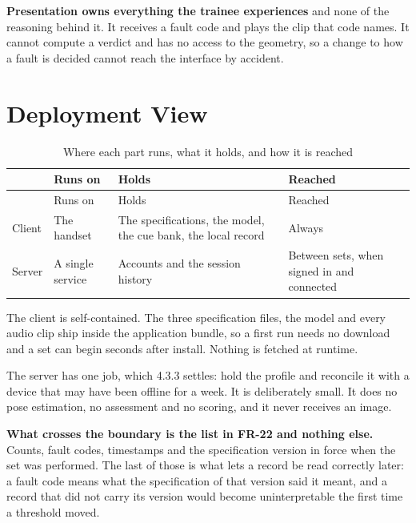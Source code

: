\textbf{Presentation owns everything the trainee experiences} and none of the reasoning behind it. It receives a fault code and plays the clip that code names. It cannot compute a verdict and has no access to the geometry, so a change to how a fault is decided cannot reach the interface by accident.

\section{Deployment View}
\label{sec:5.3}

{\footnotesize
\setlength{\LTpre}{6pt}\setlength{\LTpost}{8pt}
\begin{longtable}{>{\raggedright\arraybackslash}p{}>{\raggedright\arraybackslash}p{}>{\raggedright\arraybackslash}p{}>{\raggedright\arraybackslash}p{}}
\caption{Where each part runs, what it holds, and how it is reached}\\
\toprule
 & Runs on & Holds & Reached \\
\midrule
\endfirsthead
\toprule
 & Runs on & Holds & Reached \\
\midrule
\endhead
\bottomrule
\endfoot
\bottomrule
\endlastfoot
Client & The handset & The specifications, the model, the cue bank, the local record & Always \\
Server & A single service & Accounts and the session history & Between sets, when signed in and connected \\
\end{longtable}
}

The client is self-contained. The three specification files, the model and every audio clip ship inside the application bundle, so a first run needs no download and a set can begin seconds after install. Nothing is fetched at runtime.

The server has one job, which 4.3.3 settles: hold the profile and reconcile it with a device that may have been offline for a week. It is deliberately small. It does no pose estimation, no assessment and no scoring, and it never receives an image.

\textbf{What crosses the boundary is the list in FR-22 and nothing else.} Counts, fault codes, timestamps and the specification version in force when the set was performed. The last of those is what lets a record be read correctly later: a fault code means what the specification of that version said it meant, and a record that did not carry its version would become uninterpretable the first time a threshold moved.

